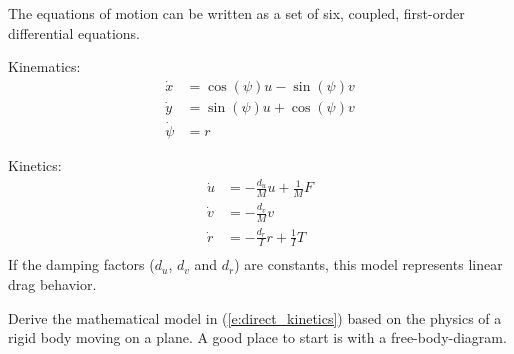 The equations of motion can be written as  a set of six, coupled, first-order differential equations.

\noindent
Kinematics:
\begin{align}\label{e:direct_kinematics}
\dot{x} & = \cos{(\psi)}u - \sin{(\psi)}v \nonumber \\
\dot{y} & = \sin{(\psi)}u + \cos{(\psi)}v \nonumber \\
\dot{\psi} & = r
\end{align}

\noindent
Kinetics:
\begin{align}\label{e:direct_kinetics}
\dot{u} & = -\frac{d_u}{M}u + \frac{1}{M}F \nonumber \\
\dot{v} & = -\frac{d_v}{M}v \nonumber \\
\dot{r} & = -\frac{d_r}{I}r + \frac{1}{I}T \\
\end{align}
If the damping factors ($d_u$, $d_v$ and $d_r$) are constants, this model represents linear drag behavior.

\begin{ex}
Derive the mathematical model in (\ref{e:direct_kinetics}) based on the physics of a rigid body moving on a plane.  A good place to start is with a free-body-diagram.
\end{ex}

